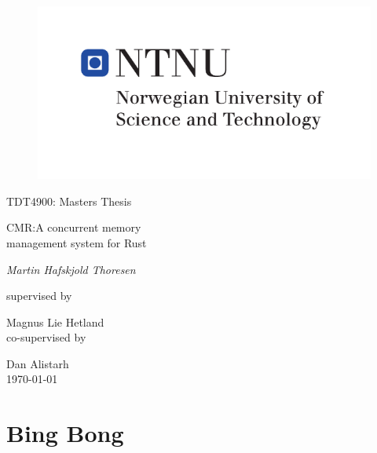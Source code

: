 \documentclass[b5paper,twoside,openright]{report}
\theoremstyle{plain}
\theoremstyle{definition}
\begin{document}
\begin{titlepage}
  \centering
  \begin{figure}[h]
    \centering
    \includegraphics{hovedlogo_eng.pdf}
  \end{figure}
  \vspace{1.5cm}
  {\Large TDT4900: Masters Thesis \par}
  \vspace{1cm}
  {\huge CMR:\@ A concurrent memory\\ management system for Rust\par}
  \vspace{2cm}
  {\Large\itshape{}Martin Hafskjold Thoresen\par}
  \vfill
  supervised by\par
  {\large Magnus Lie Hetland}\\
  \vspace{0.2cm}
  co-supervised by\par
  {\large Dan Alistarh}\\
  \vspace{1cm}
  {\large \today\\}
\end{titlepage}










\tableofcontents%
\listoffigures%
\listoftables%


\part{Bing Bong}
\pagestyle{fancy}




\end{document}
